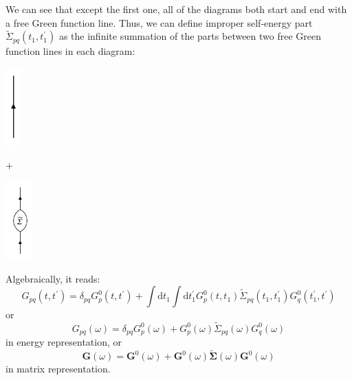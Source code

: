 We can see that except the first one, all of the diagrams both start and end with a free Green function line.
Thus, we can define improper self-energy part $\widetilde{\Sigma}_{p q}\left(t_{1}, t_{1}^{\prime}\right)$ as the infinite summation of the parts between two free Green function lines in each diagram:

\hspace{0.4\textwidth}
\begin{minipage}{0.08\textwidth}
	\includegraphics[height=3cm]{./figures/free.png}
\end{minipage}
\begin{minipage}{0.05\textwidth}
	+
\end{minipage}
\begin{minipage}{0.05\textwidth}
	\includegraphics[height=3cm]{./figures/newdyson.png}
\end{minipage}

Algebraically, it reads:
\begin{equation}
	G_{p q}\left(t, t^{\prime}\right)=\delta_{p q} G_{p}^{0}\left(t, t^{\prime}\right)+\int \mathrm{d} t_{1} \int \mathrm{d} t_{1}^{\prime} G_{p}^{0}\left(t, t_{1}\right) \widetilde{\Sigma}_{p q}\left(t_{1}, t_{1}^{\prime}\right) G_{q}^{0}\left(t_{1}^{\prime}, t^{\prime}\right)
\end{equation}
or
\begin{equation}
	G_{p q}(\omega)=\delta_{p q} G_{p}^{0}(\omega)+G_{p}^{0}(\omega) \widetilde{\Sigma}_{p q}(\omega) G_{q}^{0}(\omega)
\end{equation}
in energy representation, or 
\begin{equation}
	\boldsymbol{G}(\omega)=\boldsymbol{G}^{0}(\omega)+\boldsymbol{G}^{0}(\omega) \widetilde{\boldsymbol{\Sigma}}(\omega) \boldsymbol{G}^{0}(\omega)
\end{equation}
in matrix representation.


